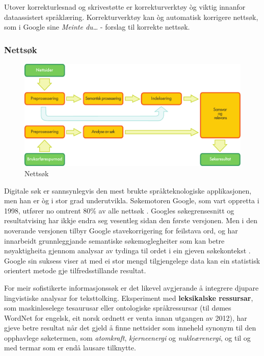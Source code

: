 \begin{multicols}{2}
Utover korrekturlesnad og skrivestøtte er korrekturverktøy òg viktig innanfor dataassistert språklæring. Korrekturverktøy kan òg automatisk korrigere nettsøk, som i Google sine \textit{Meinte du…}  - forslag til korrekte nettsøk.

\subsubsection{Nettsøk}

\begin{figure}[htb]
  \center
  \includegraphics[width=\textwidth]{../_media/norwegian-nynorsk/web_search_architecture}
  \caption{Nettsøk}
  \label{fig:websearcharch_no}
 \end{figure}

Digitale søk er sannsynlegvis den mest brukte språkteknologiske applikasjonen, men han er òg i stor grad underutvikla. Søkemotoren Google, som vart oppretta i 1998, utfører no omtrent 80\% av alle nettsøk \cite{spi1}. 
Googles søkegrensesnitt og resultatvising har ikkje endra seg vesentleg sidan den første versjonen. Men i den noverande versjonen tilbyr Google stavekorrigering for feilstava ord, og har innarbeidt grunnleggjande semantiske søkemoglegheiter som kan betre nøyaktigheita gjennom analysar av tydinga til ordet i ein gjeven søkekontekst \cite{pc1}. Google sin suksess viser at med ei stor mengd tilgjengelege data kan ein statistisk orientert metode gje tilfredsstillande resultat. 

For meir sofistikerte informasjonssøk er det likevel avgjerande å integrere djupare lingvistiske analysar for teksttolking. Eksperiment med \textbf{leksikalske ressursar}, som maskinleselege tesaurusar eller ontologiske språkressursar (til dømes WordNet for engelsk, eit norsk ordnett er venta innan utgangen av 2012), har gjeve betre resultat når det gjeld å finne nettsider som inneheld synonym til den opphavlege søketermen, som
\textit{atomkraft}, \textit{kjerneenergi} og \textit{nukleærenergi}, og til og med termar som er endå lausare tilknytte.  


\end{multicols}
